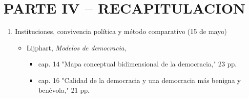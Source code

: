 \documentclass{article}
\begin{document}
\section{PARTE IV – RECAPITULACION}
\label{sec:orgf2e5875}
\begin{enumerate}
\item Instituciones, convivencia política y método comparativo (15 de mayo)
\label{sec:orgab4ea21}
\begin{itemize}
\item Lijphart, \emph{Modelos de democracia}, 
\begin{itemize}
\item cap. 14 "Mapa conceptual bidimensional de la democracia," 23 pp.
\item cap. 16 "Calidad de la democracia y una democracia más benigna y benévola," 21 pp.
\end{itemize}
\end{itemize}
\end{enumerate}
\end{document}
